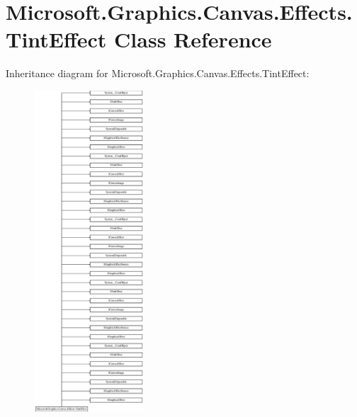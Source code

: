 \hypertarget{class_microsoft_1_1_graphics_1_1_canvas_1_1_effects_1_1_tint_effect}{}\section{Microsoft.\+Graphics.\+Canvas.\+Effects.\+Tint\+Effect Class Reference}
\label{class_microsoft_1_1_graphics_1_1_canvas_1_1_effects_1_1_tint_effect}
Inheritance diagram for Microsoft.\+Graphics.\+Canvas.\+Effects.\+Tint\+Effect\+:\begin{figure}[H]
\begin{center}
\leavevmode
\includegraphics[height=12.000000cm]{class_microsoft_1_1_graphics_1_1_canvas_1_1_effects_1_1_tint_effect}
\end{center}
\end{figure}
